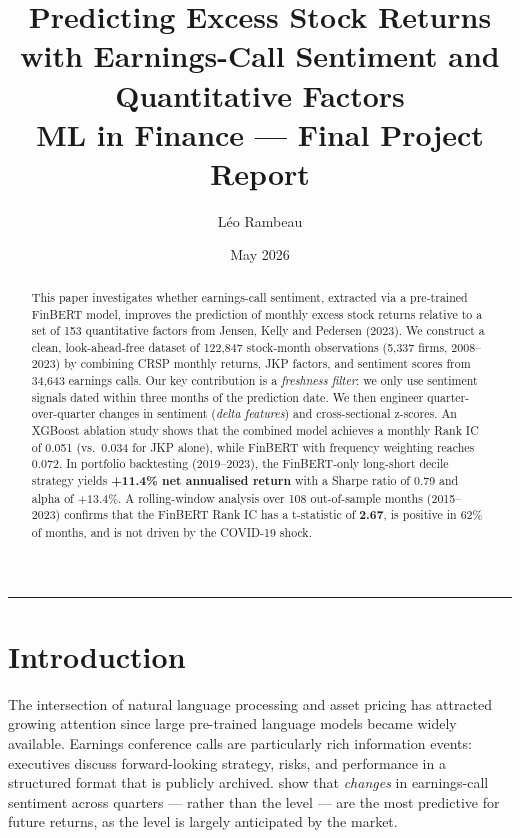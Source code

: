 \documentclass[11pt, a4paper]{article}
\title{
    \vspace{-1cm}
    {\Large \textbf{Predicting Excess Stock Returns with Earnings-Call Sentiment and Quantitative Factors}}\\[0.4em]
    {\normalsize ML in Finance --- Final Project Report}
}
\author{L\'eo Rambeau}
\date{May 2026}
\begin{document}
\maketitle
\thispagestyle{empty}

\begin{abstract}
\noindent
This paper investigates whether earnings-call sentiment, extracted via a pre-trained
FinBERT model, improves the prediction of monthly excess stock returns relative to
a set of 153 quantitative factors from Jensen, Kelly and Pedersen (2023).
We construct a clean, look-ahead-free dataset of 122,847 stock-month observations
(5,337 firms, 2008--2023) by combining CRSP monthly returns, JKP factors, and
sentiment scores from 34,643 earnings calls.
Our key contribution is a \textit{freshness filter}: we only use sentiment signals
dated within three months of the prediction date.
We then engineer quarter-over-quarter changes in sentiment (\textit{delta features})
and cross-sectional z-scores.
An XGBoost ablation study shows that the combined model achieves a monthly Rank IC
of 0.051 (vs.\ 0.034 for JKP alone), while FinBERT with frequency weighting reaches
0.072.
In portfolio backtesting (2019--2023), the FinBERT-only long-short decile strategy
yields \textbf{+11.4\% net annualised return} with a Sharpe ratio of 0.79 and alpha
of $+13.4\%$.
A rolling-window analysis over 108 out-of-sample months (2015--2023) confirms
that the FinBERT Rank IC has a t-statistic of \textbf{2.67}, is positive in 62\%
of months, and is not driven by the COVID-19 shock.
\end{abstract}

\vspace{0.5em}
\hrule
\vspace{1em}

\tableofcontents
\newpage

\section{Introduction}

The intersection of natural language processing and asset pricing has attracted
growing attention since large pre-trained language models became widely available.
Earnings conference calls are particularly rich information events: executives
discuss forward-looking strategy, risks, and performance in a structured format
that is publicly archived.
\citet{huang2023} show that \textit{changes} in earnings-call sentiment
across quarters --- rather than the level --- are the most predictive for future
returns, as the level is largely anticipated by the market.
\end{document}
